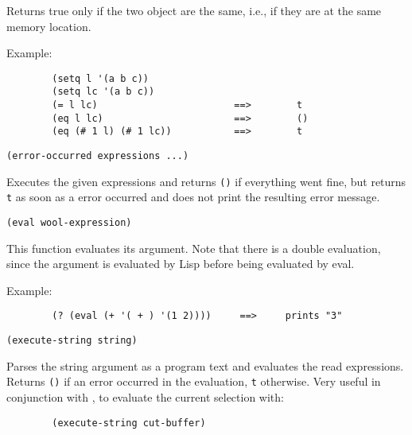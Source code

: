 Returns true only if the two object are the same, i.e., if they are at the
same memory location.

Example:{\exemplefont\upspace\begin{verbatim}
        (setq l '(a b c))
        (setq lc '(a b c))
        (= l lc)                        ==>        t
        (eq l lc)                       ==>        ()
        (eq (# 1 l) (# 1 lc))           ==>        t
\end{verbatim}}


{\usagefont\begin{verbatim}
(error-occurred expressions ...)
\end{verbatim}}\usageupspace

Executes the given expressions and returns \verb"()" if everything went
fine, but returns \verb"t" as soon as a {\WOOL} error occurred and does not
print the resulting error message.

        
{\usagefont\begin{verbatim}
(eval wool-expression)
\end{verbatim}}\usageupspace

This function evaluates its argument. Note that there is a double evaluation,
since the argument is evaluated by Lisp before being evaluated by eval.

Example:{\exemplefont\upspace\begin{verbatim}
        (? (eval (+ '( + ) '(1 2))))     ==>     prints "3"
\end{verbatim}}

        
{\usagefont\begin{verbatim}
(execute-string string)
\end{verbatim}}\usageupspace

Parses the string argument as a {\WOOL} program text and evaluates the read
expressions. Returns \verb"()" if an error occurred in the evaluation,
\verb"t" otherwise. Very useful in conjunction with ,
to evaluate the current selection with:

{\exemplefont\begin{verbatim}
        (execute-string cut-buffer)
\end{verbatim}}

